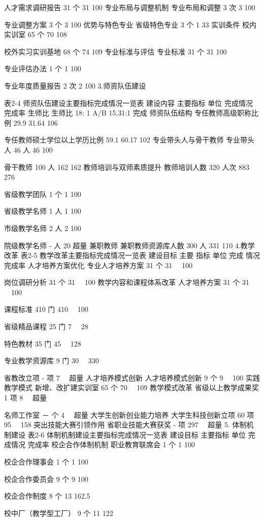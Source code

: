 人才需求调研报告
31
个
31
100%
专业布局与调整机制
专业布局和调整
3
次
3
100%

专业调整方案
3
个
3
100%
优势与特色专业
省级特色专业
3
个
1
33%
实训条件
校内实训室
65
个
70
108%

校外实习实训基地
68
个
74
109%
专业标准与评估
专业标准
31
个
31
100%

专业评估办法
1
个
1
100%

专业年度质量报告
2
次
2
100%
3.师资队伍建设

表2-4  师资队伍建设主要指标完成情况一览表
建设内容
主要指标
单位
完成情况
完成率
生师比
生师比
18: 1
A/B
15.31:1
完成
师资队伍结构
专任教师高级职称比例
29.9
%
31.64
106%

专任教师硕士学位以上学历比例
59.1
%
60.17
102%
专业带头人与骨干教师
专业带头人
46
人
46
100%

骨干教师
100
人
162
162%
教师培训与双师素质提升
教师培训人数
320
人次
883
276%

省级教学团队
1
个
1
100%

省级教学名师
1
人
1
100%

市级教学名师
2
人
2
100%

院级教学名师
-
人
20
超量
兼职教师
兼职教师资源库人数
300
人
331
110%
4.教学改革
表2-5   教学改革主要指标完成情况一览表
建设目标
主要
指标
单位
完成
情况
完成率
人才培养方案优化
专业人才培养方案
31
个
31
　100%

岗位调研分析
31
个
31
　100%
教学内容和课程体系改革
人才培养方案
31
个
31
　100%

课程标准
410
门
410
　100%

省级精品课程
25
门
7
　28%

特色教材
35
门
45
　128%

专业教学资源库
9
门
30
　330%

省教改立项
-
项
7
　超量
人才培养模式创新
人才培养模式创新
9
个
9
　100%
实践教学模式
新增、改扩建实训室
65
个
70
　109%
教学模式改革
省级以上教学成果奖
1
项
8
　超量

名师工作室
－
个
4
　超量
大学生创新创业能力培养
大学生科技创新立项
60
项
95
　158%
突出技能大赛引领作用
省职业技能大赛获奖
-
项
297
　超量
5. 体制机制建设
表2-6  体制机制建设主要指标完成情况一览表
建设目标
主要指标
单位
完成情况
完成率
校企合作体制机制
职业教育联席会
1
个
1
100%

校企合作理事会
1
个
1
100%

校企合作委员会
9
个
9
100%

校企合作制度
8
个
13
162.5%

校中厂（教学型工厂）
9
个
11
122%


